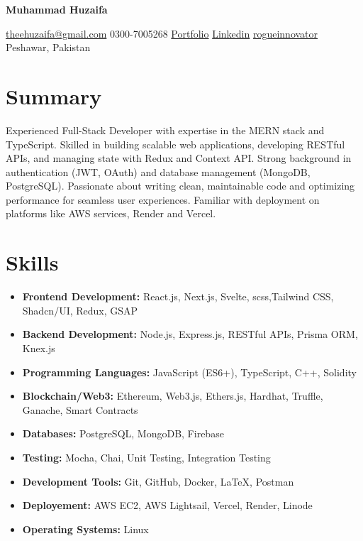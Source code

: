 \documentclass[10pt, letterpaper]{article}
\newenvironment{highlights}{
    \begin{itemize}[
        topsep=0.10 cm,
        parsep=0.10 cm,
        partopsep=0pt,
        itemsep=0pt,
        leftmargin=0.4 cm + 10pt
    ]
}{
    \end{itemize}
}
\newenvironment{header}{
    \setlength{\topsep}{0pt}\par\kern\topsep\centering\color{primaryColor}\linespread{1.5}
}{
    \par\kern\topsep
}
\let\hrefWithoutArrow\href
\renewcommand{\href}[2]{\hrefWithoutArrow{#1}{\ifthenelse{\equal{#2}{}}{ }{#2 }\raisebox{.15ex}{\footnotesize \faExternalLink*}}}
\begin{document}
\newcommand{\AND}{\unskip
	\cleaders\copy\ANDbox\hskip\wd\ANDbox
	\ignorespaces
}
\newsavebox\ANDbox
\sbox\ANDbox{}

\begin{header}
	\centering
	\fontsize{30pt}{30pt}\selectfont
	\textbf{Muhammad Huzaifa}

	\vspace{0.4cm}

	\normalsize
	\hrefWithoutArrow{mailto:theehuzaifa@gmail.com}{{\faEnvelope[regular]}\hspace{0.01cm} theehuzaifa@gmail.com} \quad
	{\faPhone*} \hspace{0.01cm} 0300-7005268 \quad
	\hrefWithoutArrow{https://portfolio-nine-fawn-23.vercel.app/}{{\faLink}\hspace{0.01cm} Portfolio} \quad
	\hrefWithoutArrow{https://www.linkedin.com/in/muhammad-huzaifa-ali-49aa94259/}{{\faLinkedinIn} \hspace{0.01cm}  Linkedin} \quad
	\hrefWithoutArrow{https://github.com/rogueinnovator}{{\faGithub}\hspace{0.01cm}  rogueinnovator} \quad
	{\faMapMarker*} Peshawar, Pakistan
\end{header}
\vspace{0.3 cm - 0.3 cm}
\section{Summary}

Experienced Full-Stack Developer with expertise in the MERN stack  and TypeScript. Skilled in building scalable web applications, developing RESTful APIs, and managing state with Redux and Context API. Strong background in authentication (JWT, OAuth) and database management (MongoDB, PostgreSQL). Passionate about writing clean, maintainable code and optimizing performance for seamless user experiences. Familiar with deployment on platforms like AWS services, Render and Vercel.
\section{Skills}
\begin{highlights}
	\item \textbf{Frontend Development:} React.js, Next.js, Svelte, scss,Tailwind CSS, Shadcn/UI, Redux, GSAP
	\item \textbf{Backend Development:} Node.js, Express.js, RESTful APIs, Prisma ORM, Knex.js
	\item \textbf{Programming Languages:} JavaScript (ES6+), TypeScript, C++, Solidity
	\item \textbf{Blockchain/Web3:} Ethereum, Web3.js, Ethers.js, Hardhat, Truffle, Ganache, Smart Contracts
	\item \textbf{Databases:} PostgreSQL, MongoDB, Firebase
	\item \textbf{Testing:} Mocha, Chai, Unit Testing, Integration Testing
	\item \textbf{Development Tools:} Git, GitHub, Docker, LaTeX, Postman
	\item \textbf{Deployement:} AWS EC2, AWS Lightsail, Vercel, Render, Linode
	\item \textbf{Operating Systems:} Linux
\end{highlights}
\end{document}
